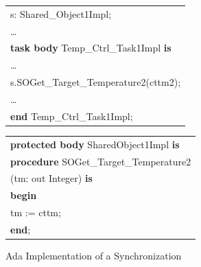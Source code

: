 \begin{figure}
\begin{sffamily}
\begin{minipage}{0.5\linewidth}
\begin{tabular}{l}
s: Shared\_Object1Impl; \\
\ldots \\
\textbf{task body} Temp\_Ctrl\_Task1Impl \textbf{is} \\
\quad \ldots\\
\quad s.SOGet\_Target\_Temperature2(cttm2);\\
\quad\ldots\\
\textbf{end} Temp\_Ctrl\_Task1Impl; 
\end{tabular}
\end{minipage}
\begin{minipage}{0.5\linewidth}
\begin{tabular}{l}
\textbf{protected body} SharedObject1Impl \textbf{is} \\
\quad\textbf{procedure} SOGet\_Target\_Temperature2\\
\qquad\qquad\qquad\qquad\qquad(tm: out Integer) \textbf{is}\\
\quad\textbf{begin}\\
\qquad tm := cttm;\\
\textbf{end};
\end{tabular}
\end{minipage}
\end{sffamily}
	\caption{Ada Implementation of a Synchronization}
	\label{fig:SynchImpl}
\end{figure}
%
